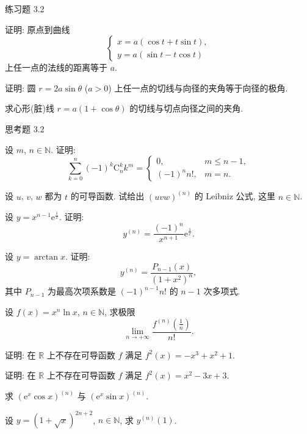 \begin{exblock}{练习题 3.2}
  \item 证明: 原点到曲线
  \[
  \begin{cases}x = a(\cos t + t\sin t),\\ y = a(\sin t - t\cos t)\end{cases}
\]
  上任一点的法线的距离等于 $a$.

  \item 证明: 圆 $r = 2a\sin\theta$ ($a > 0$) 上任一点的切线与向径的夹角等于向径的极角.

  \item 求心形(脏)线 $r = a(1 + \cos\theta)$ 的切线与切点向径之间的夹角.
\end{exblock}

\begin{exblock}{思考题 3.2}
  \item 设 $m$, $n \in \mathbb{N}$. 证明:
  \[
  \sum_{k=0}^{n}(-1)^{k}\mathrm{C}_{n}^{k}k^{m} = \begin{cases}0, & m \leqslant n-1,\\ (-1)^{n}n!, & m = n.\end{cases}
\]

  \item 设 $u$, $v$, $w$ 都为 $t$ 的可导函数. 试给出 $(uvw)^{(n)}$ 的 Leibniz 公式, 这里 $n \in \mathbb{N}$.

  \item 设 $y = x^{n-1}\mathrm{e}^{\frac{1}{x}}$. 证明:
  \[
  y^{(n)} = \frac{(-1)^{n}}{x^{n+1}}\mathrm{e}^{\frac{1}{x}}.
\]

  \item 设 $y = \arctan x$. 证明:
  \[
  y^{(n)} = \frac{P_{n-1}(x)}{(1+x^{2})^{n}},
\]
  其中 $P_{n-1}$ 为最高次项系数是 $(-1)^{n-1}n!$ 的 $n-1$ 次多项式.

  \item 设 $f(x) = x^{n}\ln x$, $n \in \mathbb{N}$, 求极限
  \[
  \lim_{n\to+\infty}\frac{f^{(n)}\left(\frac{1}{n}\right)}{n!}.
\]

  \item 证明: 在 $\mathbb{R}$ 上不存在可导函数 $f$ 满足 $f^{2}(x) = -x^{3} + x^{2} + 1$.

  \item 证明: 在 $\mathbb{R}$ 上不存在可导函数 $f$ 满足 $f^{2}(x) = x^{2} - 3x + 3$.

  \item 求 $\left(\mathrm{e}^{x}\cos x\right)^{(n)}$ 与 $\left(\mathrm{e}^{x}\sin x\right)^{(n)}$.

  \item 设 $y = (1 + \sqrt{x})^{2n+2}$, $n \in \mathbb{N}$, 求 $y^{(n)}(1)$.


\end{exblock}
